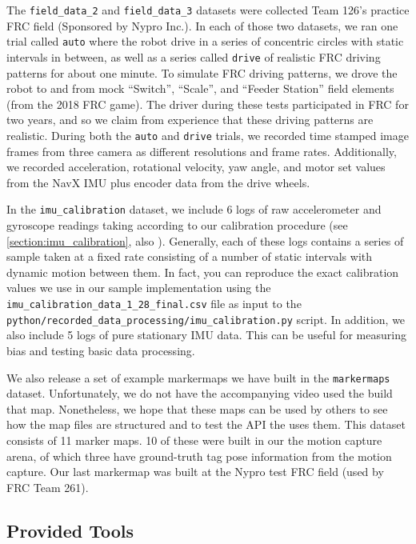 \documentclass{article}
\begin{document}
  The \texttt{field\_data\_2} and \texttt{field\_data\_3} datasets were collected Team 126's practice FRC field (Sponsored by Nypro Inc.). In each of those two datasets, we ran one trial called \texttt{auto} where the robot drive in a series of concentric circles with static intervals in between, as well as a series called \texttt{drive} of realistic FRC driving patterns for about one minute. To simulate FRC driving patterns, we drove the robot to and from mock ``Switch'', ``Scale'', and ``Feeder Station'' field elements (from the 2018 FRC game). The driver during these tests participated in FRC for two years, and so we claim from experience that these driving patterns are realistic. During both the \texttt{auto} and \texttt{drive} trials, we recorded time stamped image frames from three camera as different resolutions and frame rates. Additionally, we recorded acceleration, rotational velocity, yaw angle, and motor set values from the NavX IMU plus encoder data from the drive wheels.

  In the \texttt{imu\_calibration} dataset, we include 6 logs of raw accelerometer and gyroscope readings taking according to our calibration procedure (see \ref{section:imu_calibration}, also \cite{tedaldi_robust_2014}). Generally, each of these logs contains a series of sample taken at a fixed rate consisting of a number of static intervals with dynamic motion between them. In fact, you can reproduce the exact calibration values we use in our sample implementation using the \texttt{imu\_calibration\_data\_1\_28\_final.csv} file as input to the \texttt{python/recorded\_data\_processing/imu\_calibration.py} script. In addition, we also include 5 logs of pure stationary IMU data. This can be useful for measuring bias and testing basic data processing.

  We also release a set of example markermaps we have built in the \texttt{markermaps} dataset. Unfortunately, we do not have the accompanying video used the build that map. Nonetheless, we hope that these maps can be used by others to see how the map files are structured and to test the API the uses them. This dataset consists of 11 marker maps. 10 of these were built in our the motion capture arena, of which three have ground-truth tag pose information from the motion capture. Our last markermap was built at the Nypro test FRC field (used by FRC Team 261).


  \subsection{Provided Tools} \label{section:tools}
\end{document}

